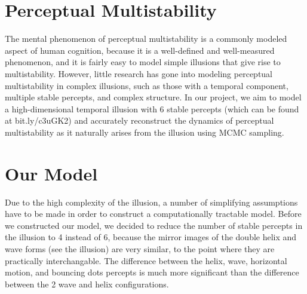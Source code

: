 \documentclass{article} %
\begin{document}



\section{Perceptual Multistability}
The mental phenomenon of perceptual multistability is a commonly modeled aspect of human cognition, because it is a well-defined and well-measured phenomenon, and it is fairly easy to model simple illusions that give rise to multistability.
However, little research has gone into modeling perceptual multistability in complex illusions, such as those with a temporal component, multiple stable percepts, and complex structure. 
In our project, we aim to model a high-dimensional temporal illusion with 6 stable percepts (which can be found at bit.ly/c3uGK2) and accurately reconstruct the dynamics of perceptual multistability as it naturally arises from the illusion using MCMC sampling. 


\section{Our Model}
Due to the high complexity of the illusion, a number of simplifying assumptions have to be made in order to construct a computationally tractable model. Before we constructed our model, we decided to reduce the number of stable percepts in the illusion to 4 instead of 6, because the mirror images of the double helix and wave forms (see the illusion) are very similar, to the point where they are practically interchangable. The difference between the helix, wave, horizontal motion, and bouncing dots percepts is much more significant than the difference between the 2 wave and helix configurations. 
\end{document}
